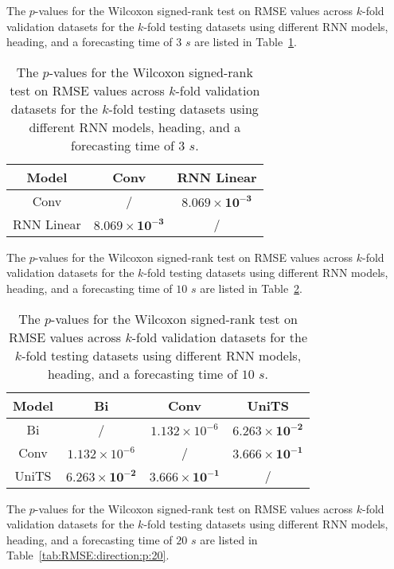 The $p$-values for the Wilcoxon signed-rank test on RMSE values across $k$-fold validation datasets for the $k$-fold testing datasets using different RNN models, heading, and a forecasting time of $3$ $s$ are listed in Table~\ref{tab:RMSE:direction:p:3}.

\begin{table}[!ht]
	\centering
	\begin{tabular}{|c|c|c|}
		\hline
		Model & Conv & RNN Linear \\ \hline
		Conv & / & $\mathbf{8.069 \times 10^{-3}}$ \\ \hline
		RNN Linear & $\mathbf{8.069 \times 10^{-3}}$ & / \\ \hline
	\end{tabular}
	\caption{The $p$-values for the Wilcoxon signed-rank test on RMSE values across $k$-fold validation datasets for the $k$-fold testing datasets using different RNN models, heading, and a forecasting time of $3$ $s$.}
	\label{tab:RMSE:direction:p:3}
\end{table}

The $p$-values for the Wilcoxon signed-rank test on RMSE values across $k$-fold validation datasets for the $k$-fold testing datasets using different RNN models, heading, and a forecasting time of $10$ $s$ are listed in Table~\ref{tab:RMSE:direction:p:10}.

\begin{table}[!ht]
	\centering
	\begin{tabular}{|c|c|c|c|}
		\hline
		Model & Bi & Conv & UniTS \\ \hline
		Bi & / & $1.132 \times 10^{-6}$ & $\mathbf{6.263 \times 10^{-2}}$ \\ \hline
		Conv & $1.132 \times 10^{-6}$ & / & $\mathbf{3.666 \times 10^{-1}}$ \\ \hline
		UniTS & $\mathbf{6.263 \times 10^{-2}}$ & $\mathbf{3.666 \times 10^{-1}}$ & / \\ \hline
	\end{tabular}
	\caption{The $p$-values for the Wilcoxon signed-rank test on RMSE values across $k$-fold validation datasets for the $k$-fold testing datasets using different RNN models, heading, and a forecasting time of $10$ $s$.}
	\label{tab:RMSE:direction:p:10}
\end{table}

The $p$-values for the Wilcoxon signed-rank test on RMSE values across $k$-fold validation datasets for the $k$-fold testing datasets using different RNN models, heading, and a forecasting time of $20$ $s$ are listed in Table~\ref{tab:RMSE:direction:p:20}.

